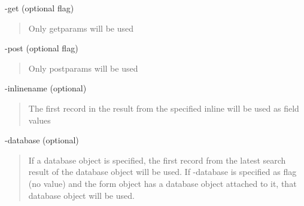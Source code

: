 \documentclass[letterpaper,10pt,english]{sphinxmanual}
\begin{document}
\begin{fulllineitems}
\begin{fulllineitems}
\begin{description}
-get (optional flag)
\begin{quote}

Only getparams will be used
\end{quote}

-post (optional flag)
\begin{quote}

Only postparams will be used
\end{quote}

-inlinename (optional)
\begin{quote}

The first record in the result from the specified inline will be used as
field values
\end{quote}

-database (optional)
\begin{quote}

If a database object is specified, the first record from the latest
search result of the database object will be used. If -database is
specified as flag (no value) and the form object has a database object
attached to it, that database object will be used.
\end{quote}

\end{description}

\end{fulllineitems}


\begin{fulllineitems}
\label{knop_form:knop_form.lockvalue}
\end{fulllineitems}


\begin{fulllineitems}
\label{knop_form:knop_form.lockvalue_decrypted}
\end{fulllineitems}


\begin{fulllineitems}
\label{knop_form:knop_form.method}
\end{fulllineitems}



\begin{fulllineitems}
\end{fulllineitems}


\end{fulllineitems}
\end{document}
